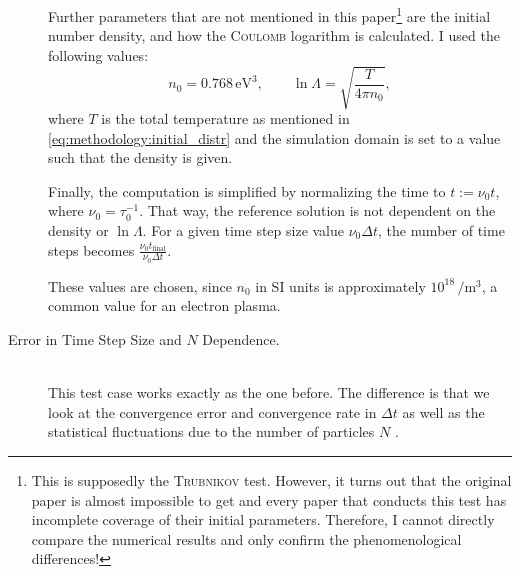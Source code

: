 \begin{description}
    Further parameters that are not mentioned in this paper\footnote{This is supposedly the \textsc{Trubnikov} test. However, it turns out that the original paper is almost impossible to get and every paper that conducts this test has incomplete coverage of their initial parameters. Therefore, I cannot directly compare the numerical results and only confirm the phenomenological differences!} are the initial number density, and how the \textsc{Coulomb} logarithm is calculated. I used the following values:
    \begin{equation*}
        n_0 = 0.768 \,\si{\electronvolt\cubed},
        \qquad \ln\Lambda = \sqrt{\frac{T}{4 \pi n_0}} ,
    \end{equation*}
    where $T$ is the total temperature as mentioned in \eqref{eq:methodology:initial_distr} and the simulation domain is set to a value such that the density is given. 

    Finally, the computation is simplified by normalizing the time to $t := \nu_0t$, where $\nu_0 = \tau_0^{-1}$. That way, the reference solution is not dependent on the density or $\ln\Lambda$. For a given time step size value $\nu_0\Delta t$, the number of time steps becomes $\frac{\nu_0 t_\mathrm{final}}{\nu_0\Delta t}$.

    These values are chosen, since $n_0$ in SI units is approximately $10^{18}\,\si{\per\metre\cubed}$, a common value for an electron plasma. %
    
    \item[Error in Time Step Size and $N$ Dependence.] \hfill \\
    This test case works exactly as the one before. The difference is that we look at the convergence error and convergence rate in $\Delta t$ \cite[4315--4318]{Wang2008} as well as the statistical fluctuations due to the number of particles $N$ \cite[4319--4320]{Wang2008}. 


\end{description}
